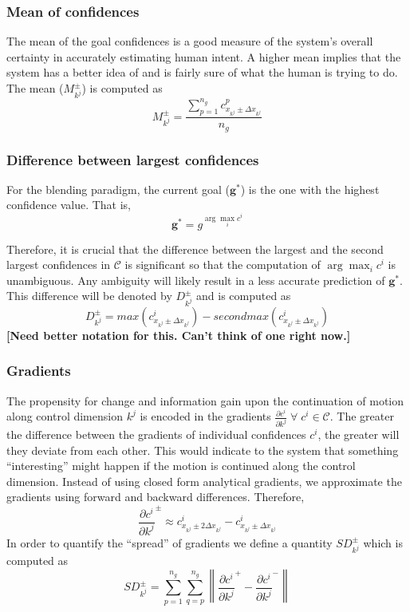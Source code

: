 \documentclass[conference]{IEEEtran}
\newcommand{\argmax}{\arg\!\max}
\newcommand{\norm}[1]{\left\lVert#1\right\rVert}
\begin{document}
\subsubsection{Mean of confidences}
The mean of the goal confidences is a good measure of the system's overall certainty in accurately estimating human intent. A higher mean implies that the system has a better idea of and is fairly sure of what the human is trying to do. The mean ($M^{\pm}_{k^j}$) is computed as
\begin{equation*}
M^{\pm}_{k^j} = \frac{\sum_{p = 1}^{n_g}c^{p}_{x_{k^j}\pm\Delta x_{k^j}}}{n_g}
\end{equation*}
\subsubsection{Difference between largest confidences}
For the blending paradigm, the current goal ($\boldsymbol{g}^{*}$) is the one with the highest confidence value. That is, 
\begin{equation*}
\boldsymbol{g}^{*} = g^{\argmax_i c^i}
\end{equation*}

Therefore, it is crucial that the difference between the largest and the second largest confidences in $\mathcal{C}$ is significant so that the computation of $\argmax_i c^i$ is unambiguous. Any ambiguity will likely result in a less accurate prediction of $\boldsymbol{g}^*$. This difference will be denoted by $D^{\pm}_{k^j}$ and is computed as
\begin{equation*}
D^{\pm}_{k^j} = max(c^{i}_{x_{k^j}\pm\Delta x_{k^j}}) - secondmax(c^{i}_{x_{k^j}\pm\Delta x_{k^j}})
\end{equation*}
\textbf{[Need better notation for this. Can't think of one right now.]}
\subsubsection{Gradients}
The propensity for change and information gain upon the continuation of motion along control dimension $k^j$ is encoded in the gradients $\frac{\partial c^i}{\partial k^j}\; \forall\; c^i\in \mathcal{C}$. The greater the difference between the gradients of individual confidences $c^i$, the greater will they deviate from each other. This would indicate to the system that something ``interesting'' might happen if the motion is continued along the control dimension. Instead of using closed form analytical gradients, we approximate the gradients using forward and backward differences. Therefore, 
\begin{equation*}
\frac{\partial c^i}{\partial k^j}^{\pm} \approx c^{i}_{x_{k^j} \pm 2\Delta x_{k^j}} - c^{i}_{x_{k^j} \pm \Delta x_{k^j}} 
\end{equation*}
In order to quantify the ``spread'' of gradients we define a quantity $SD^{\pm}_{k^j}$ which is computed as 
\begin{equation*}
SD^{\pm}_{k^j} = \sum_{p=1}^{n_g}\sum_{q=p}^{n_g}\norm{\frac{\partial c^i}{\partial k^j}^{+} - \frac{\partial c^i}{\partial k^j}^{-}}
\end{equation*}
\end{document}
